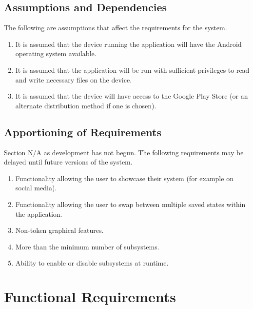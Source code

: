 \documentclass[]{article}
\begin{document}
\subsection{Assumptions and Dependencies}
\label{sub:assumptions_and_dependencies}
	The following are assumptions that affect the requirements for the system.
	\begin{enumerate}
	\item It is assumed that the device running the application will have the Android operating system available.
	\item It is assumed that the application will be run with sufficient privileges to read and write necessary files on the device.
	\item  It is assumed that the device will have access to the Google Play Store (or an alternate distribution method if one is chosen).
	\end{enumerate}

\subsection{Apportioning of Requirements}
\label{sub:apportioning_of_requirements}
	Section N/A as development has not begun.
	The following requirements may be delayed until future versions of the system.
	\begin{enumerate}
		\item Functionality allowing the user to showcase their system (for example on social media).
		\item Functionality allowing the user to swap between multiple saved states within the application.
		\item Non-token graphical features.
		\item More than the minimum number of subsystems.
		\item Ability to enable or disable subsystems at runtime.
	\end{enumerate}

\section{Functional Requirements}
\label{sec:functional_requirements}
\end{document}
